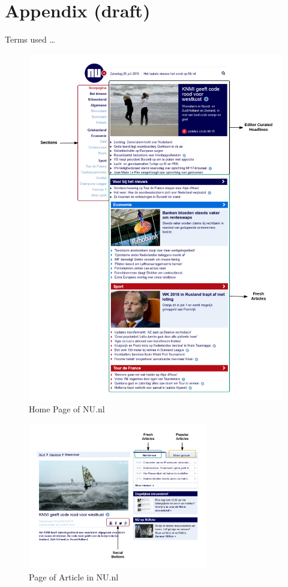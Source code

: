 \chapter{Appendix (draft)}
Terms used \ldots
\begin{figure}
\centering
\includegraphics[width=1\textwidth]{app_images/nu_1.png}
\caption{Home Page of NU.nl}
\label{fig:nu_1}
\end{figure}

\begin{figure}
\centering
\includegraphics[width=0.7\textwidth]{app_images/nu_2.png}
\caption{Page of Article in NU.nl}
\label{fig:nu_2}
\end{figure}

